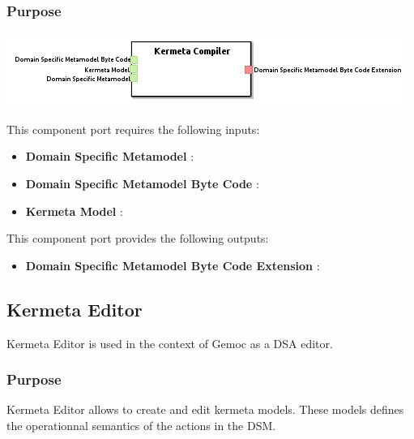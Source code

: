 \documentclass{gemoc} %
\begin{document}

\subsubsection{Purpose}


\begin{center}
\includegraphics*[trim=0.0cm 0.0cm 0cm 0.0cm, clip=true]{../images/generated/Generated_Kermeta_Compiler.png}
\end{center}

This component port requires the following inputs:
\begin{itemize}
  \item \textbf{Domain Specific Metamodel} :
  \item \textbf{Domain Specific Metamodel Byte Code} :
  \item \textbf{Kermeta Model} :
\end{itemize}

This component port provides the following outputs:
\begin{itemize}
  \item \textbf{Domain Specific Metamodel Byte Code Extension} :
\end{itemize}


\subsection{Kermeta Editor}
Kermeta Editor is used in the context of Gemoc as a DSA editor.

\subsubsection{Purpose}
Kermeta Editor allows to create and edit kermeta models. These models defines the operationnal semantics of the actions in the DSM.
\end{document}
